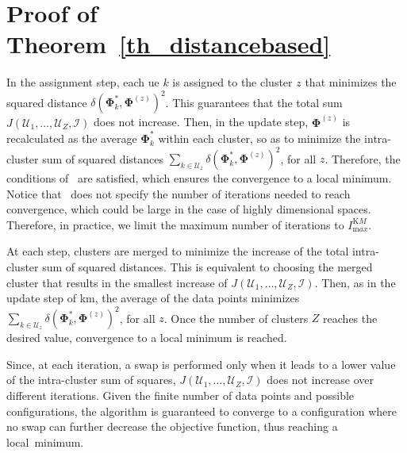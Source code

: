 \section*{Proof of Theorem~\ref{th_distancebased}}
\begin{IEEEproof}
    In the assignment step, each \gls{ue} $k$ is assigned to the cluster $z$ that minimizes the squared distance $\delta\left(\bm{\Phi}_k^*, \bm{\Phi}^{(z)}\right)^2$. This guarantees that the total sum $J(\mathcal{U}_1,\ldots,\mathcal{U}_{Z},\mathcal{I})$ does not increase. 
    Then, in the update step, $\bm{\Phi}^{(z)}$ is recalculated as the average $\bm{\Phi}_k^*$ within each cluster, so as to minimize the intra-cluster sum of squared distances $\sum_{k \in \mathcal{U}_z}\delta\left(\bm{\Phi}_k^*, \bm{\Phi}^{(z)}\right)^2$, for all $z$.
    Therefore, the conditions of~\cite[Lemma 5]{Sabin1986Global} are satisfied, which ensures the convergence to a local minimum. Notice that~\cite{Sabin1986Global} does not specify the number of iterations needed to reach convergence, which could be large in the case of highly dimensional spaces. Therefore, in practice, we limit the maximum number of iterations to $I_{\mathrm max}^{\mathrm KM}$.
\end{IEEEproof}
\begin{IEEEproof}
    At each step, clusters are merged to minimize the increase of the total intra-cluster sum of squared distances. This is equivalent to choosing the merged cluster that results in the smallest increase of $J(\mathcal{U}_1,\ldots,\mathcal{U}_{Z},\mathcal{I})$.
    Then, as in the update step of \gls{km}, the average of the data points minimizes $\sum_{k \in \mathcal{U}_z}\delta\left(\bm{\Phi}_k^*, \bm{\Phi}^{(z)}\right)^2$, for all $z$. Once the number of clusters $Z$ reaches the desired value, convergence to a local minimum is reached.
\end{IEEEproof}
\begin{IEEEproof}
    Since, at each iteration, a swap is performed only when it leads to a lower value of the intra-cluster sum of squares, $J(\mathcal{U}_1,\ldots,\mathcal{U}_{Z},\mathcal{I})$ does not increase over different iterations. Given the finite number of data points and possible configurations, the algorithm is guaranteed to converge to a configuration where no swap can further decrease the objective function, thus reaching a local~minimum.
\end{IEEEproof}